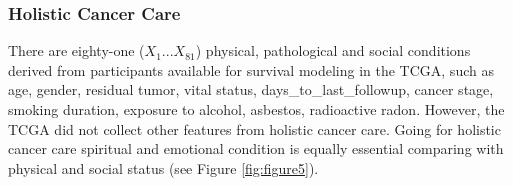 \documentclass[jpm,article,submit,moreauthors,pdftex]{Definitions/mdpi}
\begin{document}
\begin{paracol}{2}
\subsubsection{Holistic Cancer Care} 


There are eighty-one ($X_1 ... X_{81}$) physical, pathological and social conditions derived from participants available for survival modeling in the TCGA, 
such as age, gender, residual tumor, vital status, days\_to\_last\_followup, cancer stage, smoking duration, exposure to alcohol, asbestos, radioactive radon. 
However, the TCGA did not collect other features from holistic cancer care.
Going for holistic cancer care\cite{Mehta2019}\cite{Iftikhar2021} spiritual and emotional condition is equally essential comparing with physical and social status (see Figure \ref{fig:figure5}).


\end{paracol}
\end{document}
